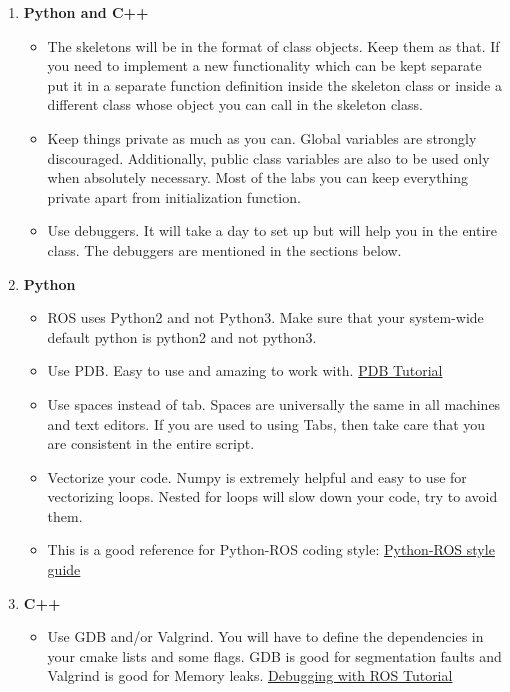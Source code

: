 \documentclass[letta4 paper]{article}
\numberwithin{equation}{section}
\newcommand{\0}{\mathbf{0}}
\begin{document}
	\begin{enumerate}
	\item \textbf{Python and C++}
	\begin{itemize}
		\item The skeletons will be in the format of class objects. Keep them as that. If you need to implement a new functionality which can be kept separate put it in a separate function definition inside the skeleton class or inside a different class whose object you can call in the skeleton class. 
		\item Keep things private as much as you can. Global variables are strongly discouraged. Additionally, public class variables are also to be used only when absolutely necessary. Most of the labs you can keep everything private apart from initialization function.
		\item Use debuggers. It will take a day to set up but will help you in the entire class. The debuggers are mentioned in the sections below.
	\end{itemize}
	\item \textbf{Python}
	\begin{itemize}
		\item ROS uses Python2 and not Python3. Make sure that your system-wide default python is python2 and not python3. 
		\item Use PDB. Easy to use and amazing to work with. \href{https://realpython.com/python-debugging-pdb/}{PDB Tutorial}
		\item Use spaces instead of tab. Spaces are universally the same in all machines and text editors. If you are used to using Tabs, then take care that you are consistent in the entire script. 
		\item Vectorize your code. Numpy is extremely helpful and easy to use for vectorizing loops. Nested for loops will slow down your code, try to avoid them.
		\item This is a good reference for Python-ROS coding style:
		\href{http://wiki.ros.org/PyStyleGuide}{Python-ROS style guide}
	\end{itemize}{}
	\item \textbf{C++}
	\begin{itemize}
		\item Use GDB and/or Valgrind. You will have to define the dependencies in your cmake lists and some flags. GDB is good for segmentation faults and Valgrind is good for Memory leaks.
		\href{http://wiki.ros.org/roslaunch/Tutorials/Roslaunch%20Nodes%20in%20Valgrind%20or%20GDB}{Debugging with ROS Tutorial}

\end{itemize}
\end{enumerate}
\end{document}
